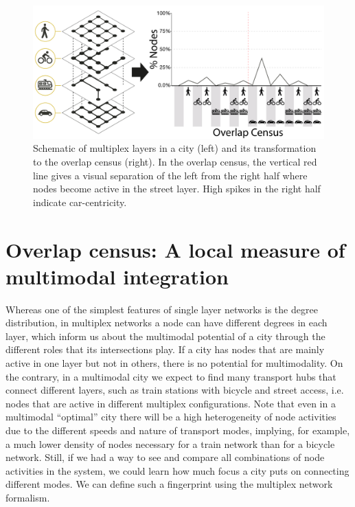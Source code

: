 \begin{figure}[th!]
	\centering
	\includegraphics[width=\textwidth]{images/multiplex/SchemaOverlapCensus.png}
	\caption[Schematic overlap census]{
		Schematic of multiplex layers in a city (left) and its transformation to the overlap census (right). In the overlap census, the vertical red line gives a visual separation of the left from the right half where nodes become active in the street layer. High spikes in the right half indicate car-centricity.}
	\label{fig:SchemaOverlapCensus}
\end{figure}

\section{Overlap census: A local measure of multimodal integration}
Whereas one of the simplest features of single layer networks is the degree distribution, in multiplex networks a node can have different degrees in each layer, which inform us about the multimodal potential of a city through the different roles that its intersections play. If a city has nodes that are mainly active in one layer but not in others, there is no potential for multimodality. On the contrary, in a multimodal city we expect to find many transport hubs that connect different layers, such as train stations with bicycle and street access, i.e. nodes that are active in different multiplex configurations. Note that even in a multimodal ``optimal'' city there will be a high heterogeneity of node activities due to the different speeds and nature of transport modes, implying, for example, a much lower density of nodes necessary for a train network than for a bicycle network. Still, if we had a way to see and compare all combinations of node activities in the system, we could learn how much focus a city puts on connecting different modes. We can define such a fingerprint using the multiplex network formalism.

